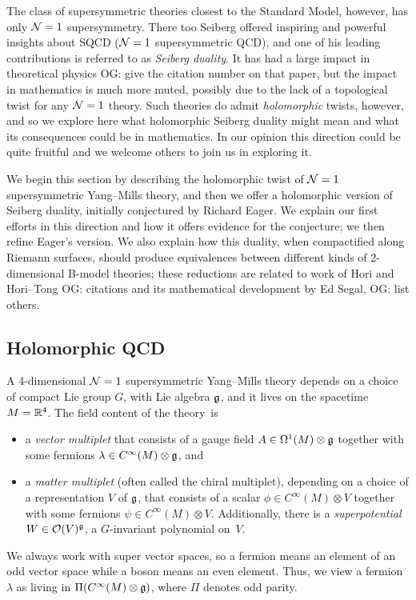 \documentclass[11pt]{amsart}
\def\owen#1{{\textcolor{violet!65!black}{OG: {#1}}}}
\begin{document}
The class of supersymmetric theories closest to the Standard Model, however, has only $\mathcal N=1$ supersymmetry.
There too Seiberg offered inspiring and powerful insights about SQCD ($\mathcal N=1$ supersymmetric QCD),
and one of his leading contributions is referred to as {\em Seiberg duality}.
It has had a large impact in theoretical physics \owen{give the citation number on that paper},
but the impact in mathematics is much more muted,
possibly due to the lack of a topological twist for any $\mathcal N=1$ theory.
Such theories do admit {\em holomorphic} twists, however, 
and so we explore here what holomorphic Seiberg duality might mean and what its consequences could be in mathematics.
In our opinion this direction could be quite fruitful and we welcome others to join us in exploring it.

We begin this section by describing the holomorphic twist of $\mathcal N=1$ supersymmetric Yang--Mills theory,
and then we offer a holomorphic version of Seiberg duality, 
initially conjectured by Richard Eager.
We explain our first efforts in this direction and how it offers evidence for the conjecture;
we then refine Eager's version.
We also explain how this duality, when compactified along Riemann surfaces,
should produce equivalences between different kinds of 2-dimensional B-model theories;
these reductions are related to work of Hori and Hori--Tong \owen{citations} and its mathematical development by Ed Segal, \owen{list others}.

\subsection{Holomorphic QCD}

A 4-dimensional $\mathcal N=1$ supersymmetric Yang--Mills theory depends on a choice of compact Lie group $G$, with Lie algebra $\mathfrak g$, 
and it lives on  the spacetime $M=\mathbb R^4$.
The field content of the theory~is
\begin{itemize}
\item a {\it vector multiplet} that consists of a gauge field $A \in \Omega^1(M) \otimes \mathfrak g $ together with some fermions $\lambda \in C^\infty(M) \otimes \mathfrak g$, and
\item a {\it matter multiplet} (often called the chiral multiplet), depending on a choice of a representation $V$ of $\mathfrak g$, that consists of a scalar $\phi \in C^\infty(M) \otimes V$ together with some fermions $\psi \in C^\infty(M) \otimes V$. 
Additionally, there is a {\it superpotential} $W \in \mathcal O(V)^\mathfrak g$, a $G$-invariant polynomial on~$V$. 
\end{itemize}
We always work with super vector spaces, so a fermion means an element of an odd vector space while a boson means an even element.
Thus, we view a fermion $\lambda$ as living in $\Pi (C^\infty(M) \otimes \mathfrak g)$,
where $\Pi$ denotes odd parity.
\end{document}
